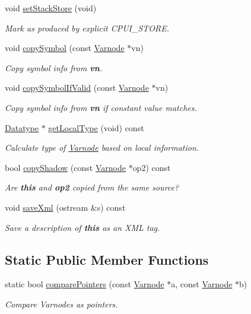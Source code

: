 \begin{DoxyCompactItemize}
void \mbox{\hyperlink{class_varnode_a436a339108f2a3de35d1faea16d95a9d}{set\+Stack\+Store}} (void)
\begin{DoxyCompactList}\small\item\em Mark as produced by explicit C\+P\+U\+I\+\_\+\+S\+T\+O\+RE. \end{DoxyCompactList}\item 
void \mbox{\hyperlink{class_varnode_a5b21f0980bc223331c25bf4e609b1254}{copy\+Symbol}} (const \mbox{\hyperlink{class_varnode}{Varnode}} $\ast$vn)
\begin{DoxyCompactList}\small\item\em Copy symbol info from {\bfseries{vn}}. \end{DoxyCompactList}\item 
void \mbox{\hyperlink{class_varnode_a436ec606351beaa6fb2fe7dc1bb4312c}{copy\+Symbol\+If\+Valid}} (const \mbox{\hyperlink{class_varnode}{Varnode}} $\ast$vn)
\begin{DoxyCompactList}\small\item\em Copy symbol info from {\bfseries{vn}} if constant value matches. \end{DoxyCompactList}\item 
\mbox{\hyperlink{class_datatype}{Datatype}} $\ast$ \mbox{\hyperlink{class_varnode_ae02e0cb9be55fc557361b707068599c5}{get\+Local\+Type}} (void) const
\begin{DoxyCompactList}\small\item\em Calculate type of \mbox{\hyperlink{class_varnode}{Varnode}} based on local information. \end{DoxyCompactList}\item 
bool \mbox{\hyperlink{class_varnode_ad543c86a9969b04287f7c4037f5f2eac}{copy\+Shadow}} (const \mbox{\hyperlink{class_varnode}{Varnode}} $\ast$op2) const
\begin{DoxyCompactList}\small\item\em Are {\bfseries{this}} and {\bfseries{op2}} copied from the same source? \end{DoxyCompactList}\item 
void \mbox{\hyperlink{class_varnode_ab594852b697b20dea20d2f4d7551b8dd}{save\+Xml}} (ostream \&s) const
\begin{DoxyCompactList}\small\item\em Save a description of {\bfseries{this}} as an X\+ML tag. \end{DoxyCompactList}\end{DoxyCompactItemize}
\subsection*{Static Public Member Functions}
\begin{DoxyCompactItemize}
\item 
static bool \mbox{\hyperlink{class_varnode_a5739fd0f16b4321090f1108a4c618229}{compare\+Pointers}} (const \mbox{\hyperlink{class_varnode}{Varnode}} $\ast$a, const \mbox{\hyperlink{class_varnode}{Varnode}} $\ast$b)
\begin{DoxyCompactList}\small\item\em Compare Varnodes as pointers. \end{DoxyCompactList}\end{DoxyCompactItemize}
